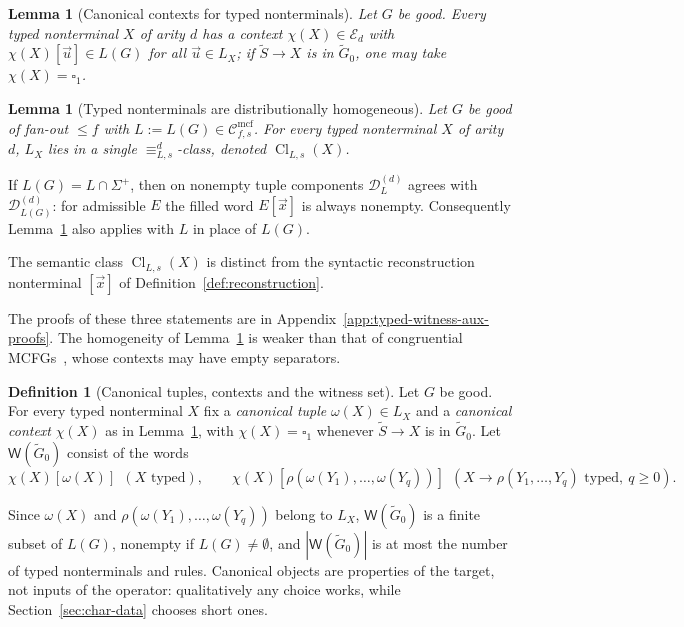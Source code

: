 \documentclass[11pt]{article}
\numberwithin{equation}{section}
\theoremstyle{plain}
\newtheorem{lemma}[theorem]{Lemma}
\theoremstyle{definition}
\newtheorem{definition}[theorem]{Definition}
\theoremstyle{remark}
\newcommand{\Wit}{\mathsf{W}}
\newcommand{\Cmcf}[2]{\mathcal{C}^{\mathrm{mcf}}_{#1,#2}}
\newcommand{\D}{\mathcal{D}}
\newcommand{\tuple}[1]{\vec{#1}}
\newcommand{\blank}{\square}
\theoremstyle{plain}
\begin{document}
\begin{lemma}[Canonical contexts for typed nonterminals]
\label{lem:identity-canonical-contexts}
Let $G$ be good.  Every typed nonterminal $X$ of arity $d$ has a context
$\chi(X)\in\mathcal E_d$ with $\chi(X)[\tuple u]\in L(G)$ for all
$\tuple u\in L_X$; if $\widetilde S\to X$ is in $\widetilde G_0$, one may take
$\chi(X)=\blank_1$.
\end{lemma}

\begin{lemma}[Typed nonterminals are distributionally homogeneous]
\label{lem:typed-homogeneity}
Let $G$ be good of fan-out $\le f$ with $L:=L(G)\in\Cmcf{f}{s}$.  For every typed nonterminal $X$
of arity $d$, $L_X$ lies in a single $\equiv_{L,s}^d$-class, denoted
$\operatorname{Cl}_{L,s}(X)$.
\end{lemma}

If $L(G)=L\cap\Sigma^+$, then on nonempty tuple components
$\D_L^{(d)}$ agrees with $\D_{L(G)}^{(d)}$: for admissible $E$
the filled word $E[\tuple x]$ is always nonempty.
Consequently Lemma~\ref{lem:typed-homogeneity} also applies with
$L$ in place of $L(G)$.

The semantic class $\operatorname{Cl}_{L,s}(X)$ is distinct from the syntactic
reconstruction nonterminal $[\tuple x]$ of Definition~\ref{def:reconstruction}.

The proofs of these three statements are in
Appendix~\ref{app:typed-witness-aux-proofs}.  The homogeneity of
Lemma~\ref{lem:typed-homogeneity} is weaker than that of congruential
MCFGs~\cite{ClarkYoshinaka2016}, whose contexts may have empty separators.

\begin{definition}[Canonical tuples, contexts and the witness set]
\label{def:target-canonical}
\label{def:witness-set}
Let $G$ be good.  For every typed nonterminal $X$ fix a \emph{canonical tuple}
$\omega(X)\in L_X$ and a \emph{canonical context} $\chi(X)$ as in
Lemma~\ref{lem:identity-canonical-contexts}, with $\chi(X)=\blank_1$ whenever
$\widetilde S\to X$ is in $\widetilde G_0$.  Let $\Wit(\widetilde G_0)$
consist of the words
\[
 \chi(X)[\omega(X)]\ \ (X\text{ typed}),\qquad
 \chi(X)[\rho(\omega(Y_1),\ldots,\omega(Y_q))]\ \
 (X\to\rho(Y_1,\ldots,Y_q)\text{ typed},\ q\ge0).
\]
\end{definition}

Since $\omega(X)$ and $\rho(\omega(Y_1),\ldots,\omega(Y_q))$ belong to $L_X$,
$\Wit(\widetilde G_0)$ is a finite subset of $L(G)$, nonempty if
$L(G)\ne\emptyset$, and $|\Wit(\widetilde G_0)|$ is at most the number of
typed nonterminals and rules.  Canonical objects are properties of the
target, not inputs of the operator: qualitatively any choice works, while
Section~\ref{sec:char-data} chooses short ones.
\end{document}

